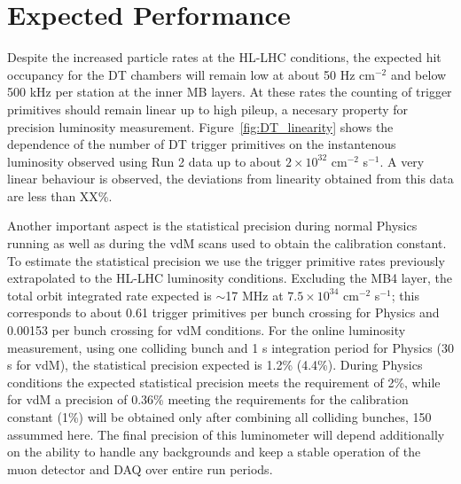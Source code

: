 \section{Expected Performance}

Despite the increased particle rates at the HL-LHC conditions, the expected hit occupancy for the DT chambers will remain low at about 50 Hz cm$^{-2}$
and below 500 kHz per station at the inner MB layers.
At these rates the counting of trigger primitives should remain linear up to high pileup, a necesary property for precision luminosity measurement.
Figure~\ref{fig:DT_linearity} shows the dependence of the number of DT trigger primitives on the instantenous luminosity
observed using Run 2 data up to about $2\times10^{32}$ cm$^{-2}$ s$^{-1}$.
A very linear behaviour is observed, the deviations from linearity obtained from this data are less than XX\%.

Another important aspect is the statistical precision during normal Physics running as well as during the vdM scans used to obtain the calibration constant.
To estimate the statistical precision we use the trigger primitive rates previously extrapolated to the HL-LHC luminosity conditions.
Excluding the MB4 layer, the total orbit integrated rate expected is $\sim$17 MHz at $7.5\times10^{34}$ cm$^{-2}$ s$^{-1}$;
this corresponds to about 0.61 trigger primitives per bunch crossing for Physics and 0.00153 per bunch crossing for vdM conditions.    
For the online luminosity measurement, using one colliding bunch and 1 s integration period for Physics (30 s for vdM),
the statistical precision expected is 1.2\% (4.4\%).
During Physics conditions the expected statistical precision meets the requirement of 2\%,
while for vdM a precision of 0.36\%  meeting the requirements for the calibration constant (1\%) will be obtained only after combining all colliding bunches, 150 assummed here.
The final precision of this luminometer will depend additionally on the ability to handle any backgrounds and keep a stable operation of the muon detector and DAQ over entire run periods.


\clearpage


